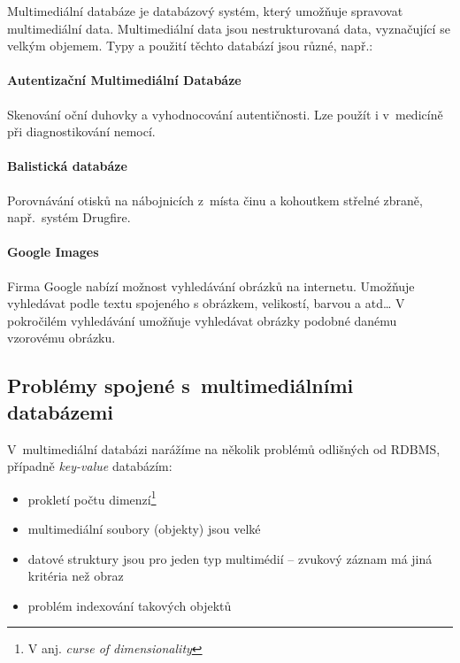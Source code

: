 Multimediální databáze je databázový systém, který umožňuje spravovat multimediální data. 
Multimediální data jsou nestrukturovaná data, vyznačující se velkým objemem.
Typy a použití těchto databází jsou různé, např.:


\paragraph{Autentizační Multimediální Databáze}

Skenování oční duhovky a vyhodnocování autentičnosti.
Lze použít i v~medicíně při diagnostikování nemocí.


\paragraph{Balistická databáze}

Porovnávání otisků na nábojnicích z~místa činu a kohoutkem střelné zbraně, např.~systém Drugfire\cite{drugfire}.

\paragraph{Google Images}

Firma Google nabízí možnost vyhledávání obrázků na internetu.
Umožňuje vyhledávat podle textu spojeného s obrázkem, velikostí, barvou a atd\ldots{}
V pokročilém vyhledávání umožňuje vyhledávat obrázky podobné danému vzorovému obrázku\cite{miller2011using}.

\subsection{Problémy spojené s~multimediálními databázemi}

V~multimediální databázi narážíme na několik problémů odlišných od  RDBMS, případně \emph{key-value} databázím\cite{no-sql}:
\begin{itemize}
\item prokletí počtu dimenzí\cite{Bellman195706}\footnote{V anj. \emph{curse of dimensionality}}
\item multimediální soubory (objekty) jsou velké
\item datové struktury jsou pro jeden typ multimédií -- zvukový záznam má jiná kritéria než obraz
\item problém indexování takových objektů
\end{itemize}

